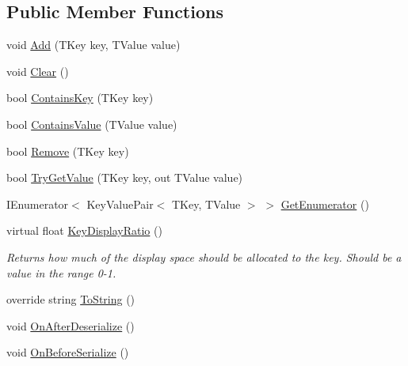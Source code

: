 \subsection*{Public Member Functions}
\begin{DoxyCompactItemize}
\item 
void \mbox{\hyperlink{class_leap_1_1_unity_1_1_serializable_dictionary_ac8288964eb2327f755c683d703e7c1fc}{Add}} (T\+Key key, T\+Value value)
\item 
void \mbox{\hyperlink{class_leap_1_1_unity_1_1_serializable_dictionary_a639b66b29184dc85c510dfa858759552}{Clear}} ()
\item 
bool \mbox{\hyperlink{class_leap_1_1_unity_1_1_serializable_dictionary_adb0dfe61a1e4012e51235683bbdba17b}{Contains\+Key}} (T\+Key key)
\item 
bool \mbox{\hyperlink{class_leap_1_1_unity_1_1_serializable_dictionary_a3c33b37ec2f3ed641a8bd26edebe13d8}{Contains\+Value}} (T\+Value value)
\item 
bool \mbox{\hyperlink{class_leap_1_1_unity_1_1_serializable_dictionary_a30c184229841877e480fd3cb1a16d207}{Remove}} (T\+Key key)
\item 
bool \mbox{\hyperlink{class_leap_1_1_unity_1_1_serializable_dictionary_a2e1b99c2ddcefc2fb599290ac3158690}{Try\+Get\+Value}} (T\+Key key, out T\+Value value)
\item 
I\+Enumerator$<$ Key\+Value\+Pair$<$ T\+Key, T\+Value $>$ $>$ \mbox{\hyperlink{class_leap_1_1_unity_1_1_serializable_dictionary_ad6975ce8fcf734f94863e9fda5506ccb}{Get\+Enumerator}} ()
\item 
virtual float \mbox{\hyperlink{class_leap_1_1_unity_1_1_serializable_dictionary_a237caec5f2755f82e24f0eedf9005968}{Key\+Display\+Ratio}} ()
\begin{DoxyCompactList}\small\item\em Returns how much of the display space should be allocated to the key. Should be a value in the range 0-\/1. \end{DoxyCompactList}\item 
override string \mbox{\hyperlink{class_leap_1_1_unity_1_1_serializable_dictionary_a4756832a6c1b8f6c6a88f3d465583132}{To\+String}} ()
\item 
void \mbox{\hyperlink{class_leap_1_1_unity_1_1_serializable_dictionary_a7ea2114f250e768f7cde70359178d83d}{On\+After\+Deserialize}} ()
\item 
void \mbox{\hyperlink{class_leap_1_1_unity_1_1_serializable_dictionary_a5ee05f76684d203c2d801682b1f039ef}{On\+Before\+Serialize}} ()
\end{DoxyCompactItemize}
